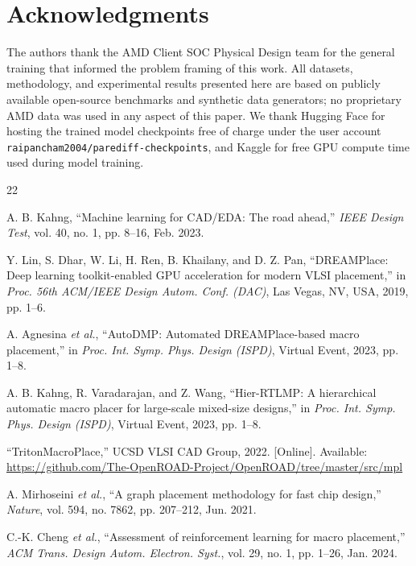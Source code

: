 \documentclass[lettersize,journal]{IEEEtran}
\begin{document}
\section*{Acknowledgments}

The authors thank the AMD Client SOC Physical Design team for the general training that informed the problem framing of this work. All datasets, methodology, and experimental results presented here are based on publicly available open-source benchmarks and synthetic data generators; no proprietary AMD data was used in any aspect of this paper. We thank Hugging Face for hosting the trained model checkpoints free of charge under the user account \texttt{raipancham2004/parediff-checkpoints}, and Kaggle for free GPU compute time used during model training.

\begin{thebibliography}{22}


A. B. Kahng, ``Machine learning for CAD/EDA: The road ahead,'' \emph{IEEE Design Test}, vol. 40, no. 1, pp. 8--16, Feb. 2023.

Y. Lin, S. Dhar, W. Li, H. Ren, B. Khailany, and D. Z. Pan, ``DREAMPlace: Deep learning toolkit-enabled GPU acceleration for modern VLSI placement,'' in \emph{Proc. 56th ACM/IEEE Design Autom. Conf. (DAC)}, Las Vegas, NV, USA, 2019, pp. 1--6.

A. Agnesina \emph{et al.}, ``AutoDMP: Automated DREAMPlace-based macro placement,'' in \emph{Proc. Int. Symp. Phys. Design (ISPD)}, Virtual Event, 2023, pp. 1--8.

A. B. Kahng, R. Varadarajan, and Z. Wang, ``Hier-RTLMP: A hierarchical automatic macro placer for large-scale mixed-size designs,'' in \emph{Proc. Int. Symp. Phys. Design (ISPD)}, Virtual Event, 2023, pp. 1--8.

``TritonMacroPlace,'' UCSD VLSI CAD Group, 2022. [Online]. Available: \url{https://github.com/The-OpenROAD-Project/OpenROAD/tree/master/src/mpl}

A. Mirhoseini \emph{et al.}, ``A graph placement methodology for fast chip design,'' \emph{Nature}, vol. 594, no. 7862, pp. 207--212, Jun. 2021.

C.-K. Cheng \emph{et al.}, ``Assessment of reinforcement learning for macro placement,'' \emph{ACM Trans. Design Autom. Electron. Syst.}, vol. 29, no. 1, pp. 1--26, Jan. 2024.


\end{thebibliography}
\end{document}
